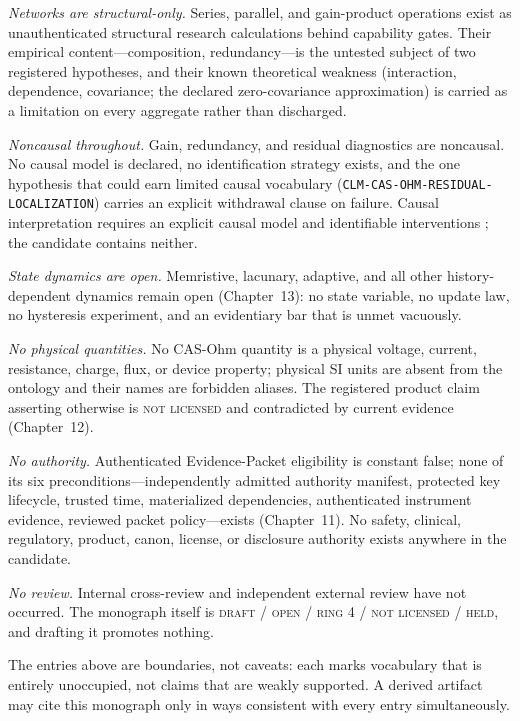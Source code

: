 \emph{Networks are structural-only.} Series, parallel, and gain-product operations exist as unauthenticated structural research calculations behind capability gates. Their empirical content---composition, redundancy---is the untested subject of two registered hypotheses, and their known theoretical weakness (interaction, dependence, covariance; the declared zero-covariance approximation) is carried as a limitation on every aggregate rather than discharged.

\emph{Noncausal throughout.} Gain, redundancy, and residual diagnostics are noncausal. No causal model is declared, no identification strategy exists, and the one hypothesis that could earn limited causal vocabulary (\texttt{CLM-CAS-OHM-RESIDUAL-LOCALIZATION}) carries an explicit withdrawal clause on failure. Causal interpretation requires an explicit causal model and identifiable interventions \cite{pearl}; the candidate contains neither.

\emph{State dynamics are open.} Memristive, lacunary, adaptive, and all other history-dependent dynamics remain open (Chapter~13): no state variable, no update law, no hysteresis experiment, and an evidentiary bar that is unmet vacuously.

\emph{No physical quantities.} No CAS-Ohm quantity is a physical voltage, current, resistance, charge, flux, or device property; physical SI units are absent from the ontology and their names are forbidden aliases. The registered product claim asserting otherwise is \textsc{not licensed} and contradicted by current evidence (Chapter~12).

\emph{No authority.} Authenticated Evidence-Packet eligibility is constant false; none of its six preconditions---independently admitted authority manifest, protected key lifecycle, trusted time, materialized dependencies, authenticated instrument evidence, reviewed packet policy---exists (Chapter~11). No safety, clinical, regulatory, product, canon, license, or disclosure authority exists anywhere in the candidate.

\emph{No review.} Internal cross-review and independent external review have not occurred. The monograph itself is \textsc{draft / open / ring 4 / not licensed / held}, and drafting it promotes nothing.

\begin{boundary}\label{evid:bound:catalog}
The entries above are boundaries, not caveats: each marks vocabulary that is entirely unoccupied, not claims that are weakly supported. A derived artifact may cite this monograph only in ways consistent with every entry simultaneously.
\end{boundary}

